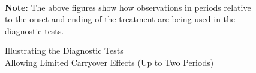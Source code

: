 \documentclass[12pt]{article}
\let\oldcenter\center
\let\oldendcenter\endcenter
\renewenvironment{center}{\setlength\topsep{0pt}\oldcenter}{\oldendcenter}
\begin{document}
\begin{figure}[!ht]
\caption{Illustrating the Diagnostic Tests\\Allowing Limited Carryover Effects (Up to Two Periods)}\label{fg:tests2}
\centering
\begin{minipage}{0.95\linewidth}
\begin{center}
\hspace{-2em}
\hspace{2em}
\\
\end{center}
\footnotesize\textbf{Note:} The above figures show how observations in periods relative to the onset and ending of the treatment are being used in the diagnostic tests. 
\end{minipage}
\vspace{-1em}
\end{figure}

\clearpage
\end{document}
